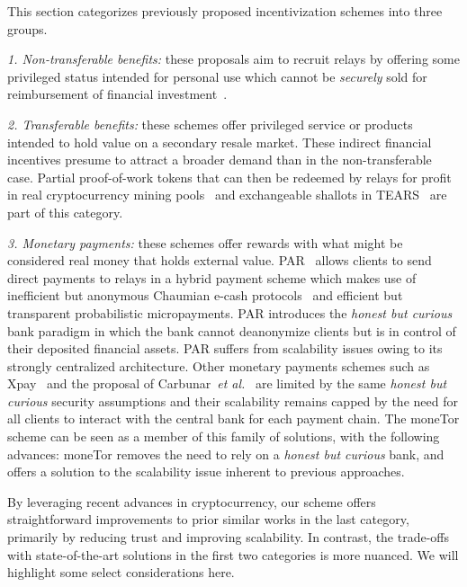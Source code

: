 This section categorizes previously proposed incentivization schemes into three groups.

\noindent \emph{1. Non-transferable benefits:} these proposals aim to recruit relays by offering some privileged status intended for personal use which cannot be \emph{securely} sold for reimbursement of financial investment~\cite{dingledine2010building,jansen2010recruiting, jansen2013lira}.

\noindent \emph{2. Transferable benefits:} these schemes offer privileged service or products intended to hold value on a secondary resale market.
These indirect financial incentives presume to attract a broader demand than in the non-transferable case.
Partial proof-of-work tokens that can then be redeemed by relays for profit in real cryptocurrency mining pools~\cite{biryukov2015proof} and exchangeable shallots in TEARS~\cite{jansen2014onions} are part of this category.

\noindent \emph{3. Monetary payments:} these schemes offer rewards with what might be considered real money that holds external value.
PAR~\cite{androulaki2008payment} allows clients to send direct payments to relays in a hybrid payment scheme which makes use of inefficient but anonymous Chaumian e-cash protocols~\cite{chaum1988untraceable} and efficient but transparent probabilistic micropayments.
PAR introduces the \emph{honest but curious} bank paradigm in which the bank cannot deanonymize clients but is in control of their deposited financial assets.
PAR suffers from scalability issues owing to its strongly centralized architecture.
Other monetary payments schemes such as Xpay~\cite{chen2009xpay} and the proposal of Carbunar~\textit{et al.}~\cite{carbunar2012tipping} are limited by the same \emph{honest but curious} security assumptions and their scalability remains capped by the need for all clients to interact with the central bank for each payment chain.
The moneTor scheme can be seen as a member of this family of solutions, with the following advances: moneTor removes the need to rely on a \textit{honest but curious} bank, and offers a solution to the scalability issue inherent to previous approaches.

By leveraging recent advances in cryptocurrency, our scheme offers straightforward improvements to prior similar works in the last category, primarily by reducing trust and improving scalability.
In contrast, the trade-offs with state-of-the-art solutions in the first two categories is more nuanced.
We will highlight some select considerations here.

